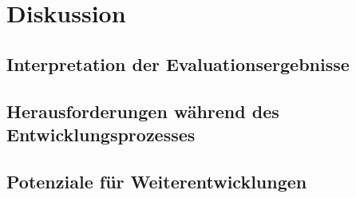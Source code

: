 \chapter{Diskussion}
\section{Interpretation der Evaluationsergebnisse}
\section{Herausforderungen während des Entwicklungsprozesses}
\section{Potenziale für Weiterentwicklungen}